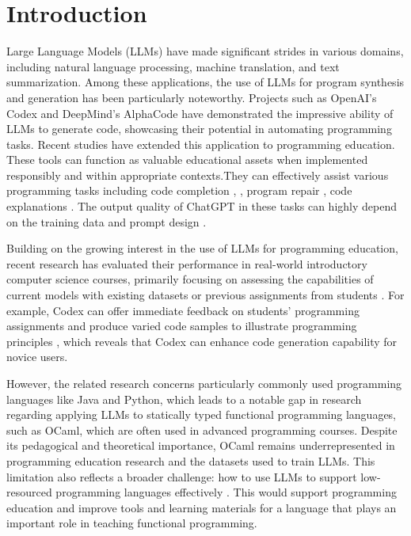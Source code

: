 \section{Introduction}
Large Language Models (LLMs) have made significant strides in various domains, including natural language processing, machine translation, and text summarization. Among these applications, the use of LLMs for program synthesis and generation has been particularly noteworthy. Projects such as OpenAI's Codex \cite{10.1145/3597503.3639219} and DeepMind's AlphaCode \cite{10.1109/ICSE48619.2023.00181} have demonstrated the impressive ability of LLMs to generate code, showcasing their potential in automating programming tasks. Recent studies have extended this application to programming education. These tools can function as valuable educational assets when implemented responsibly and within appropriate contexts.They can effectively assist various programming tasks including code completion \cite{10.1109/COMPSAC57700.2023.00117}, \cite{10.1145/3639474.3640076}, program repair \cite{10.5555/3618408.3618894}, code explanations \cite{Chen2023GPTutorAC}. The output quality of ChatGPT in these tasks can highly depend on the training data and prompt design \cite{10.5555/3618408.3618894}. 

Building on the growing interest in the use of LLMs for programming education, recent research has evaluated their performance in real-world introductory computer science courses, primarily focusing on assessing the capabilities of current models with existing datasets or previous assignments from students \cite{hicke2023aitaintelligentquestionanswerteaching, anishka2024chatgptplayroleteaching}. For example, Codex can offer immediate feedback on students' programming assignments and produce varied code samples to illustrate programming principles \cite{kumar2024impactguidanceinteractionstrategies}, which reveals that Codex can enhance code generation capability for novice users.

However, the related research concerns particularly commonly used programming languages like Java and Python, which leads to a notable gap in research regarding applying LLMs to statically typed functional programming languages, such as OCaml, which are often used in advanced programming courses. Despite its pedagogical and theoretical importance, OCaml remains underrepresented in programming education research and the datasets used to train LLMs. This limitation also reflects a broader challenge: how to use LLMs to support low-resourced programming languages effectively \cite{mora2024syntheticprogrammingelicitationtexttocode, 10.1145/3689735, deng2024assessingcodegenerationintermediate}. This would support programming education and improve tools and learning materials for a language that plays an important role in teaching functional programming.


